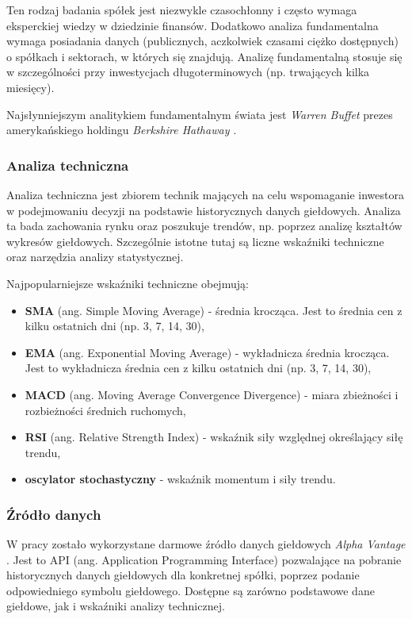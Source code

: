 \documentclass[a4paper, twoside, 11pt, openright]{article}
\begin{document}
Ten rodzaj badania spółek jest niezwykle czasochłonny i często wymaga eksperckiej wiedzy w dziedzinie finansów. Dodatkowo analiza fundamentalna wymaga posiadania danych (publicznych, aczkolwiek czasami ciężko dostępnych) o spółkach i sektorach, w których się znajdują. Analizę fundamentalną stosuje się w szczególności przy inwestycjach długoterminowych (np. trwających kilka miesięcy).

Najsłynniejszym analitykiem fundamentalnym świata jest \textit{Warren Buffet} prezes amerykańskiego holdingu \textit{Berkshire Hathaway \cite{berkeshire}}. 

\subsubsection{Analiza techniczna}

Analiza techniczna \cite{technicalanalysis} jest zbiorem technik mających na celu wspomaganie inwestora w podejmowaniu decyzji na podstawie historycznych danych giełdowych. Analiza ta bada zachowania rynku oraz poszukuje trendów, np. poprzez analizę kształtów wykresów giełdowych. Szczególnie istotne tutaj są liczne wskaźniki techniczne oraz narzędzia analizy statystycznej.

Najpopularniejsze wskaźniki techniczne obejmują:
\begin{itemize}
\item{\textbf{SMA} (ang. Simple Moving Average)} - średnia krocząca. Jest to średnia cen z kilku ostatnich dni (np. 3, 7, 14, 30),
\item{\textbf{EMA} (ang. Exponential Moving Average)} - wykładnicza średnia krocząca. Jest to wykładnicza średnia cen z kilku ostatnich dni (np. 3, 7, 14, 30),
\item{\textbf{MACD} (ang. Moving Average Convergence Divergence)} -  miara zbieżności i rozbieżności średnich ruchomych,
\item{\textbf{RSI} (ang. Relative Strength Index)} -  wskaźnik siły względnej określający siłę trendu,
\item{\textbf{oscylator stochastyczny}} -  wskaźnik momentum i siły trendu.
\end{itemize}

\subsubsection{Źródło danych}

W pracy zostało wykorzystane darmowe źródło danych giełdowych \textit{Alpha Vantage} \cite{alphavantage}. Jest to API (ang. Application Programming Interface) pozwalające na pobranie historycznych danych giełdowych dla konkretnej spółki, poprzez podanie odpowiedniego symbolu giełdowego. Dostępne są zarówno podstawowe dane giełdowe, jak i wskaźniki analizy technicznej. 
\end{document}
